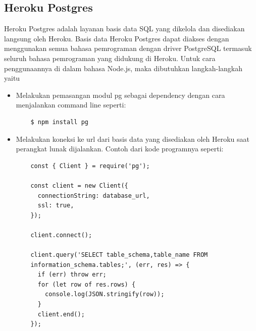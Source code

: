 \subsection{Heroku Postgres}
Heroku Postgres adalah layanan basis data SQL yang dikelola dan disediakan langsung oleh Heroku. Basis data Heroku Postgres dapat diakses dengan menggunakan semua bahasa pemrograman dengan driver PostgreSQL termasuk seluruh bahasa pemrograman yang didukung di Heroku. Untuk cara penggunaannya di dalam bahasa Node.js, maka dibutuhkan langkah-langkah yaitu 
\begin{itemize}
    \item Melakukan pemasangan modul pg sebagai dependency dengan cara menjalankan command line seperti:
    \begin{lstlisting}
    $ npm install pg 
    \end{lstlisting}
    \item Melakukan koneksi ke url dari basis data yang disediakan oleh Heroku saat perangkat lunak dijalankan. Contoh dari kode programnya seperti:
    \begin{lstlisting}
    const { Client } = require('pg');

    const client = new Client({
      connectionString: database_url,
      ssl: true,
    });
    
    client.connect();
    
    client.query('SELECT table_schema,table_name FROM
    information_schema.tables;', (err, res) => {
      if (err) throw err;
      for (let row of res.rows) {
        console.log(JSON.stringify(row));
      }
      client.end();
    });
    \end{lstlisting}
\end{itemize}
